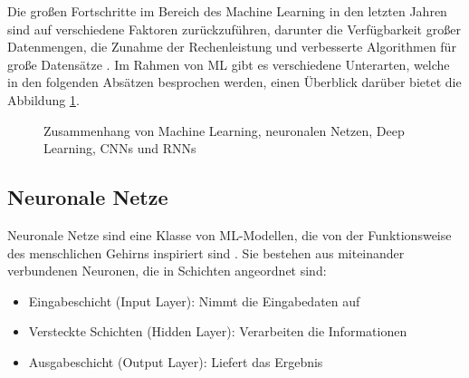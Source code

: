 Die großen Fortschritte im Bereich des Machine Learning in den letzten Jahren sind auf verschiedene Faktoren zurückzuführen, darunter die Verfügbarkeit großer Datenmengen, die Zunahme der Rechenleistung und verbesserte Algorithmen für große Datensätze \cite{jordan2015machine}.
Im Rahmen von \gls{ML} gibt es verschiedene Unterarten, welche in den folgenden Absätzen besprochen werden, einen Überblick darüber bietet die Abbildung \ref{fig:ml-hierarchy}.

\begin{figure}[h]
\centering
{}
\caption{Zusammenhang von Machine Learning, neuronalen Netzen, Deep Learning, \glspl{CNN} und \glspl{RNN}}
\label{fig:ml-hierarchy}
\end{figure}

\subsection{Neuronale Netze}
\label{subsec:neuronale-netze}
Neuronale Netze sind eine Klasse von \gls{ML}-Modellen, die von der Funktionsweise des menschlichen Gehirns inspiriert sind \cite{RebalaGopinath2019AItM}. Sie bestehen aus miteinander verbundenen Neuronen, die in Schichten angeordnet sind:
\begin{itemize}
    \item Eingabeschicht (Input Layer): Nimmt die Eingabedaten auf
    \item Versteckte Schichten (Hidden Layer): Verarbeiten die Informationen
    \item Ausgabeschicht (Output Layer): Liefert das Ergebnis
\end{itemize}

